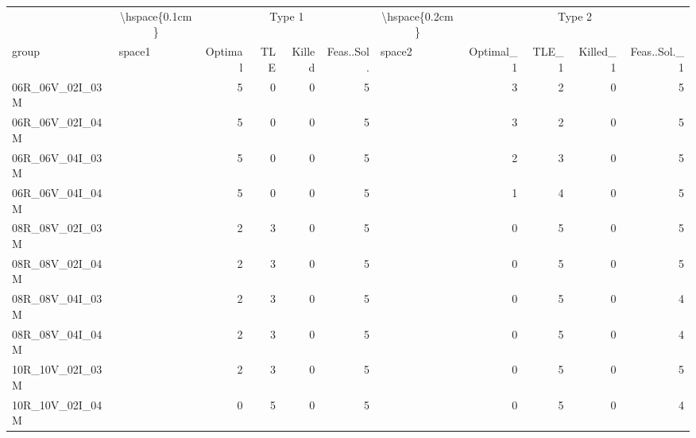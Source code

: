 
\begin{tabular}{llrrrrlrrrr}
\toprule
\multicolumn{1}{c}{} & \multicolumn{1}{c}{\textbackslash{}hspace\{0.1cm\}} & \multicolumn{4}{c}{Type 1} & \multicolumn{1}{c}{\textbackslash{}hspace\{0.2cm\}} & \multicolumn{4}{c}{Type 2} \\
\cmidrule(l{3pt}r{3pt}){2-2} \cmidrule(l{3pt}r{3pt}){3-6} \cmidrule(l{3pt}r{3pt}){7-7} \cmidrule(l{3pt}r{3pt}){8-11}
group & space1 & Optimal & TLE & Killed & Feas..Sol. & space2 & Optimal\_1 & TLE\_1 & Killed\_1 & Feas..Sol.\_1\\
\midrule
06R\_06V\_02I\_03M & \hspace{0.1cm} & 5 & 0 & 0 & 5 & \hspace{0.2cm} & 3 & 2 & 0 & 5\\
06R\_06V\_02I\_04M & \hspace{0.1cm} & 5 & 0 & 0 & 5 & \hspace{0.2cm} & 3 & 2 & 0 & 5\\
06R\_06V\_04I\_03M & \hspace{0.1cm} & 5 & 0 & 0 & 5 & \hspace{0.2cm} & 2 & 3 & 0 & 5\\
06R\_06V\_04I\_04M & \hspace{0.1cm} & 5 & 0 & 0 & 5 & \hspace{0.2cm} & 1 & 4 & 0 & 5\\
\addlinespace
08R\_08V\_02I\_03M & \hspace{0.1cm} & 2 & 3 & 0 & 5 & \hspace{0.2cm} & 0 & 5 & 0 & 5\\
08R\_08V\_02I\_04M & \hspace{0.1cm} & 2 & 3 & 0 & 5 & \hspace{0.2cm} & 0 & 5 & 0 & 5\\
08R\_08V\_04I\_03M & \hspace{0.1cm} & 2 & 3 & 0 & 5 & \hspace{0.2cm} & 0 & 5 & 0 & 4\\
08R\_08V\_04I\_04M & \hspace{0.1cm} & 2 & 3 & 0 & 5 & \hspace{0.2cm} & 0 & 5 & 0 & 4\\
\addlinespace
10R\_10V\_02I\_03M & \hspace{0.1cm} & 2 & 3 & 0 & 5 & \hspace{0.2cm} & 0 & 5 & 0 & 5\\
10R\_10V\_02I\_04M & \hspace{0.1cm} & 0 & 5 & 0 & 5 & \hspace{0.2cm} & 0 & 5 & 0 & 4\\

\end{tabular}
